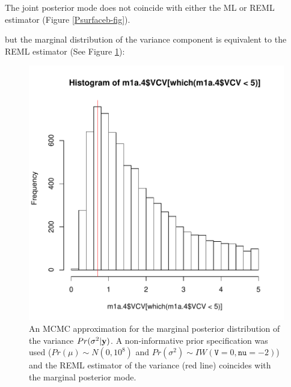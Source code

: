 \documentclass{article}
\begin{document}
The joint posterior mode does not coincide with either the ML or REML estimator (Figure \ref{Psurfaceb-fig}).  


but the marginal distribution of the variance component is equivalent to the REML estimator (See Figure \ref{Pmarg.NI-fig}):

\iftalk
\else
\fi

\begin{figure}[!h]
\begin{center}
\includegraphics{Lecture1-075}
\end{center}
\caption{An MCMC approximation for the marginal posterior distribution of the variance $Pr(\sigma^{2} | {\bf y})$.  A non-informative prior specification was used ($Pr(\mu)\sim N(0, 10^8)$ and  $Pr(\sigma^{2})\sim IW(\texttt{V}=0, \texttt{nu}=-2)$) and the REML estimator of the variance (red line) coincides with the marginal posterior mode.}
\label{Pmarg.NI-fig}
\end{figure}


\ifalone
\end{document}

